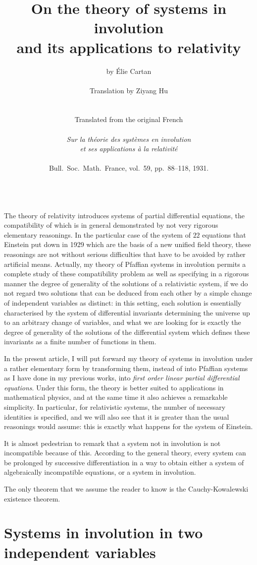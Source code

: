 \documentclass[leqno,11pt]{article}
\title{On the theory of systems in involution\\
and its applications to relativity}
\author{by \'Elie Cartan\\
\\
Translation by Ziyang Hu\\
\\
\\
Translated from the original French\\
\\
\emph{Sur la th\'eorie des syst\`emes en involution}\\ 
\emph{et ses applications \`a la relativit\'e}\\\\
{Bull.~Soc.~Math.~France, vol.~59, pp.~88--118, 1931.}
\\~
}%
\theoremstyle{shape1}
\theoremstyle{shape0}
\theoremstyle{shape2}
\theoremstyle{definition}
\begin{document}
\maketitle
\tableofcontents
\newpage
The theory of relativity introduces systems of partial differential equations, the compatibility of which is in general demonstrated by not very rigorous elementary reasonings. In the particular case of the system of $22$ equations that Einstein put down in 1929 which are the basis of a new unified field theory, these reasonings are not without serious difficulties that have to be avoided by rather artificial means. Actually, my theory of Pfaffian systems in involution permits a complete study of these compatibility problem as well as specifying in a rigorous manner the degree of generality of the solutions of a relativistic system, if we do not regard two solutions that can be deduced from each other by a simple change of independent variables as distinct: in this setting, each solution is essentially characterised by the system of differential invariants determining the universe up to an arbitrary change of variables, and what we are looking for is exactly the degree of generality of the solutions of the differential system which defines these invariants as a finite number of functions in them.

In the present article, I will put forward my theory of systems in involution under a rather elementary form by transforming them, instead of into Pfaffian systems as I have done in my previous works, into \emph{first order linear partial differential equations}. Under this form, the theory is better suited to applications in mathematical physics, and at the same time it also achieves a remarkable simplicity. In particular, for relativistic systems, the number of necessary identities is specified, and we will also see that it is greater than the usual reasonings would assume: this is exactly what happens for the system of Einstein.

It is almost pedestrian to remark that a system not in involution is not incompatible because of this. According to the general theory, every system can be prolonged by successive differentiation in a way to obtain either a system of algebraically incompatible equations, or a system in involution.

The only theorem that we assume the reader to know is the Cauchy-Kowalewski existence theorem.

\section{Systems in involution in two independent variables}
\label{sec:syst-invol-two}
\end{document}
